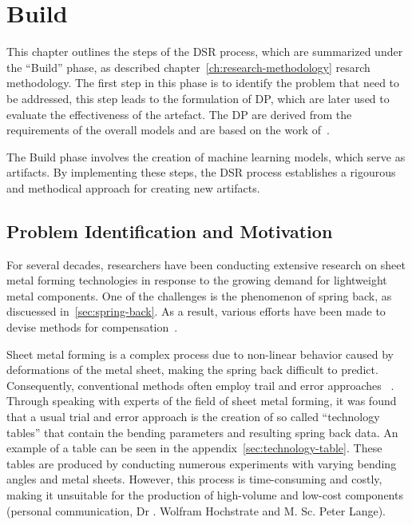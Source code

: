 
\chapter{Build}\label{ch:build}
This chapter outlines the steps of the \ac{DSR} process, which are
summarized under the ``Build'' phase, as described chapter~\ref{ch:research-methodology}
resarch methodology.
The first step in this phase is to identify the problem that need to be addressed,
this step leads to the formulation of \ac{DP}, which are later used to evaluate
the effectiveness of the artefact.
The \ac{DP} are derived from the requirements of the overall models and are based on
the work of~\cite{siebert2022construction}.

The Build phase involves the creation of machine learning models, which serve as
artifacts.
By implementing these steps, the DSR process establishes a rigourous and methodical
approach for creating new artifacts.


\section{Problem Identification and Motivation}\label{sec:problem-identification-and-
motivation}

For several decades, researchers have been conducting extensive research on sheet metal
forming technologies in response to the growing demand for lightweight metal components.
One of the challenges is the phenomenon of spring back, as discuessed in~\ref{sec:spring-back}.
As a result, various efforts have been made to devise methods for compensation~\cite[p.1]{
    liu_newmachinelearning_2012}.

Sheet metal forming is a complex process due to non-linear behavior caused by
deformations of the metal sheet, making the spring back difficult to predict.
Consequently, conventional methods often employ trail and error approaches~
\cite[p. 1]{dib_singleensembleclassifiers_2020}.
Through speaking with experts of the field of sheet metal forming, it was found that
a usual trial and error approach is the creation of so called ``technology tables'' that
contain the bending parameters and resulting spring back data. An example of a table can be seen
in the appendix~\ref{sec:technology-table}.
These tables are produced by conducting numerous experiments with varying bending
angles and metal sheets.
However, this process is time-consuming and costly, making it
unsuitable for the production of high-volume and low-cost components (personal communication, Dr
. Wolfram Hochstrate and M. Sc. Peter Lange).

